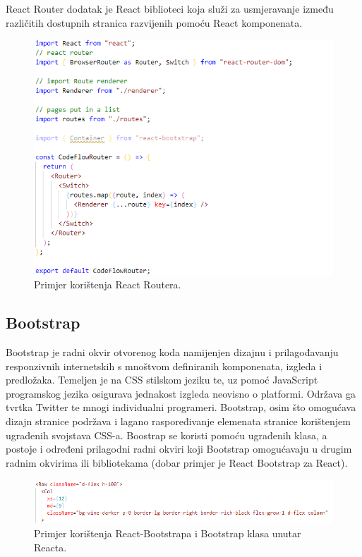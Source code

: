 \documentclass[times, utf8, zavrsni]{fer}
\begin{document}
			React Router dodatak je React biblioteci koja služi za usmjeravanje između različitih dostupnih  stranica razvijenih pomoću React komponenata.
			\begin{figure}[H]
				\centering
				\includegraphics[scale=0.75]{pictures/prikazi/ReactRouter.png}
				\caption{Primjer korištenja React Routera.}
				\label{fig:react-router}
			\end{figure}
			
			\subsection{Bootstrap}
			Bootstrap je radni okvir  otvorenog koda namijenjen dizajnu i prilagođavanju responzivnih internetskih s mnoštvom definiranih komponenata, izgleda i predložaka. Temeljen je na CSS stilskom jeziku te, uz pomoć JavaScript programskog jezika osigurava jednakost izgleda neovisno o platformi. Održava ga tvrtka Twitter te mnogi individualni programeri. Bootstrap, osim što omogućava dizajn stranice podržava i lagano raspoređivanje elemenata stranice korištenjem ugrađenih svojstava CSS-a. Boostrap se koristi pomoću ugrađenih klasa, a postoje i određeni prilagodni radni okviri koji Bootstrap omogućavaju u drugim radnim okvirima ili bibliotekama (dobar primjer je React Bootstrap za React).
			\begin{figure}[H]
				\centering
				\includegraphics[width=\linewidth]{pictures/prikazi/Bootstrap.png}
				\caption{Primjer korištenja React-Bootstrapa i Bootstrap klasa unutar Reacta.}
				\label{fig:bootstrap}
			\end{figure}
			
\end{document}
